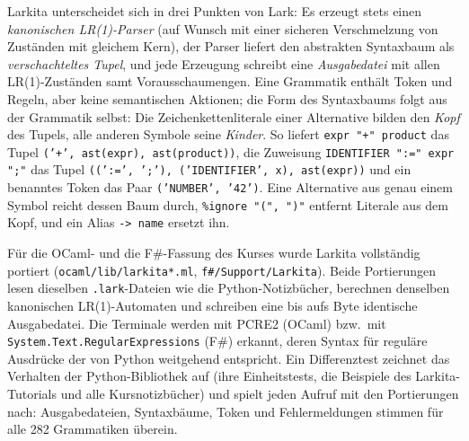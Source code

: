 Larkita unterscheidet sich in drei Punkten von Lark: Es erzeugt stets einen \emph{kanonischen LR(1)-Parser} (auf Wunsch mit einer sicheren Verschmelzung von Zuständen mit gleichem Kern), der Parser liefert den abstrakten Syntaxbaum als \emph{verschachteltes Tupel}, und jede Erzeugung schreibt eine \emph{Ausgabedatei} mit allen LR(1)-Zuständen samt Vorausschaumengen.
Eine Grammatik enthält Token und Regeln, aber keine semantischen Aktionen; die Form des Syntaxbaums folgt aus der Grammatik selbst:
Die Zeichenkettenliterale einer Alternative bilden den \emph{Kopf} des Tupels, alle anderen Symbole seine \emph{Kinder}.
So liefert \texttt{expr "+" product} das Tupel \texttt{('+', ast(expr), ast(product))}, die Zuweisung \texttt{IDENTIFIER ":=" expr ";"} das Tupel \texttt{((':=', ';'), ('IDENTIFIER', x), ast(expr))} und ein benanntes Token das Paar \texttt{('NUMBER', '42')}.
Eine Alternative aus genau einem Symbol reicht dessen Baum durch, \texttt{\%ignore "(", ")"} entfernt Literale aus dem Kopf, und ein Alias \texttt{-> name} ersetzt ihn.

Für die OCaml- und die F\#-Fassung des Kurses wurde Larkita vollständig portiert (\texttt{ocaml/lib/larkita*.ml}, \texttt{f\#/Support/Larkita}).
Beide Portierungen lesen dieselben \texttt{.lark}-Dateien wie die Python-Notizbücher, berechnen denselben kanonischen LR(1)-Automaten und schreiben eine bis aufs Byte identische Ausgabedatei.
Die Terminale werden mit PCRE2 (OCaml) bzw.\ mit \texttt{System.Text.RegularExpressions} (F\#) erkannt, deren Syntax für reguläre Ausdrücke der von Python weitgehend entspricht.
Ein Differenztest zeichnet das Verhalten der Python-Bibliothek auf (ihre Einheitstests, die Beispiele des Larkita-Tutorials und alle Kursnotizbücher) und spielt jeden Aufruf mit den Portierungen nach: Ausgabedateien, Syntaxbäume, Token und Fehlermeldungen stimmen für alle 282 Grammatiken überein.


